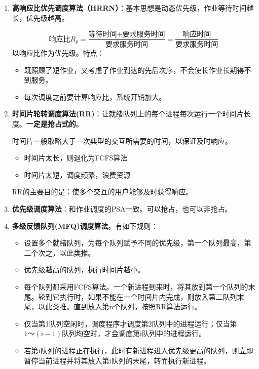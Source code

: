 \documentclass[12pt, a4paper, oneside]{ctexart}
\begin{document}
\begin{enumerate}
  \item {\bf 高响应比优先调度算法（HRRN）}：基本思想是动态优先级，作业等待时间越长，优先级越高。
  
  \begin{equation*}
    \text{响应比}R_p=\frac{\text{等待时间+要求服务时间}}{\text{要求服务时间}}=\frac{\text{响应时间}}{\text{要求服务时间}}
  \end{equation*}
  以响应比作为优先级。特点：
  \begin{itemize}
      \item 既照顾了短作业，又考虑了作业到达的先后次序，不会使长作业长期得不到服务。
      \item 每次调度之前要计算响应比，系统开销加大。
  \end{itemize}

  \item {\bf 时间片轮转调度算法(RR)}：让就绪队列上的每个进程每次运行一个时间片长度。\textbf{一定是抢占式的}。

  时间片一般取略大于一次典型的交互所需要的时间，以保证及时响应。
  \begin{itemize}
      \item 时间片太长，则退化为FCFS算法
      \item 时间片太短，调度频繁，浪费资源
  \end{itemize}

  RR的主要目的是：使多个交互的用户能够及时获得响应。

  \item {\bf 优先级调度算法}：和作业调度的PSA一致。可以抢占，也可以非抢占。

  \item {\bf 多级反馈队列(MFQ)调度算法}。有如下规则：
  \begin{itemize}
    \item 设置多个就绪队列，为每个队列赋予不同的优先级，第一个队列最高，第二个次之，以此类推。
    \item 优先级越高的队列，执行时间片越小。
    \item 每个队列都采用FCFS算法。一个新进程到来时，将其放到第一个队列的末尾。轮到它执行时，如果不能在一个时间片内完成，则放入第二队列末尾，以此类推。直到放入第n个队列，按照RR算法运行。
    \item 仅当第1队列空闲时，调度程序才调度第2队列中的进程运行；仅当第$1\text{～}(i-1)$队列均空时，才会调度第i队列中的进程运行。
    \item 若第i队列的进程正在执行，此时有新进程进入优先级更高的队列，则立即暂停当前进程并将其放入第i队列的末尾，转而执行新进程。
  \end{itemize}
\end{enumerate}
\end{document}
